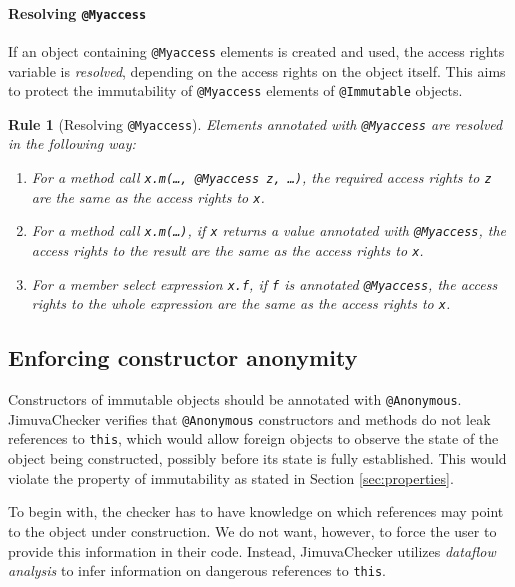 \documentclass{pracamgr}
\theoremstyle{all}
\newtheorem{verrule}{Rule}
\begin{document}
\paragraph{Resolving \texttt{@Myaccess}} 

If an object containing \texttt{@Myaccess} elements is created and
used, the access rights variable is \emph{resolved}, depending on the
access rights on the object itself. This aims to protect the
immutability of \texttt{@Myaccess} elements of \texttt{@Immutable}
objects.

\begin{verrule}[Resolving \texttt{@Myaccess}]
  Elements annotated with \texttt{@Myaccess} are resolved in the
  following way:
  \begin{enumerate}[(1)]
  \item For a method call \texttt{x.m(\dots, @Myaccess z, \dots)}, the
    required access rights to \texttt{z} are the same as the access
    rights to \texttt{x}.
  \item For a method call \texttt{x.m(\dots)}, if \texttt{x} returns a
    value annotated with \texttt{@Myaccess}, the access rights to the
    result are the same as the access rights to \texttt{x}.
  \item For a member select expression \texttt{x.f}, if \texttt{f} is
    annotated \texttt{@Myaccess}, the access rights to the whole
    expression are the same as the access rights to \texttt{x}.
  \end{enumerate}
\end{verrule}

\subsection{Enforcing constructor anonymity}

Constructors of immutable objects should be annotated with
\texttt{@Anonymous}. JimuvaChecker verifies that \texttt{@Anonymous}
constructors and methods do not leak references to \texttt{this},
which would allow foreign objects to observe the state of the object
being constructed, possibly before its state is fully
established. This would violate the property of immutability as stated
in Section \ref{sec:properties}. 

To begin with, the checker has to have knowledge on which references
may point to the object under construction. We do not want, however,
to force the user to provide this information in their code. Instead,
JimuvaChecker utilizes \emph{dataflow analysis} to infer information on
dangerous references to \texttt{this}.
\end{document}
